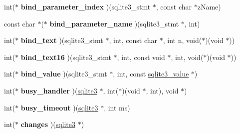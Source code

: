 \begin{DoxyCompactItemize}
\item 
int($\ast$ {\bfseries bind\+\_\+parameter\+\_\+index} )(sqlite3\+\_\+stmt $\ast$, const char $\ast$z\+Name)\hypertarget{structsqlite3__api__routines_a1985681b1e13047a8aae17676debb39d}{}\label{structsqlite3__api__routines_a1985681b1e13047a8aae17676debb39d}

\item 
const char $\ast$($\ast$ {\bfseries bind\+\_\+parameter\+\_\+name} )(sqlite3\+\_\+stmt $\ast$, int)\hypertarget{structsqlite3__api__routines_aff41be2d08dbacf60407b53567d6bead}{}\label{structsqlite3__api__routines_aff41be2d08dbacf60407b53567d6bead}

\item 
int($\ast$ {\bfseries bind\+\_\+text} )(sqlite3\+\_\+stmt $\ast$, int, const char $\ast$, int n, void($\ast$)(void $\ast$))\hypertarget{structsqlite3__api__routines_a4e64c1e01f7317ce0924683bf26b165a}{}\label{structsqlite3__api__routines_a4e64c1e01f7317ce0924683bf26b165a}

\item 
int($\ast$ {\bfseries bind\+\_\+text16} )(sqlite3\+\_\+stmt $\ast$, int, const void $\ast$, int, void($\ast$)(void $\ast$))\hypertarget{structsqlite3__api__routines_a4613c5fa0a1fac009914ddd0f4415cfd}{}\label{structsqlite3__api__routines_a4613c5fa0a1fac009914ddd0f4415cfd}

\item 
int($\ast$ {\bfseries bind\+\_\+value} )(sqlite3\+\_\+stmt $\ast$, int, const \hyperlink{structMem}{sqlite3\+\_\+value} $\ast$)\hypertarget{structsqlite3__api__routines_aca47715615cc037cd2f850e8c87cd68d}{}\label{structsqlite3__api__routines_aca47715615cc037cd2f850e8c87cd68d}

\item 
int($\ast$ {\bfseries busy\+\_\+handler} )(\hyperlink{structsqlite3}{sqlite3} $\ast$, int($\ast$)(void $\ast$, int), void $\ast$)\hypertarget{structsqlite3__api__routines_a4dd578712242bb36acf8568f1c0da278}{}\label{structsqlite3__api__routines_a4dd578712242bb36acf8568f1c0da278}

\item 
int($\ast$ {\bfseries busy\+\_\+timeout} )(\hyperlink{structsqlite3}{sqlite3} $\ast$, int ms)\hypertarget{structsqlite3__api__routines_a403a82d983e3a60444761e4f78d6269c}{}\label{structsqlite3__api__routines_a403a82d983e3a60444761e4f78d6269c}

\item 
int($\ast$ {\bfseries changes} )(\hyperlink{structsqlite3}{sqlite3} $\ast$)\hypertarget{structsqlite3__api__routines_a1379bef0cb6e5e352dc26a34e2d02477}{}\label{structsqlite3__api__routines_a1379bef0cb6e5e352dc26a34e2d02477}


\end{DoxyCompactItemize}
